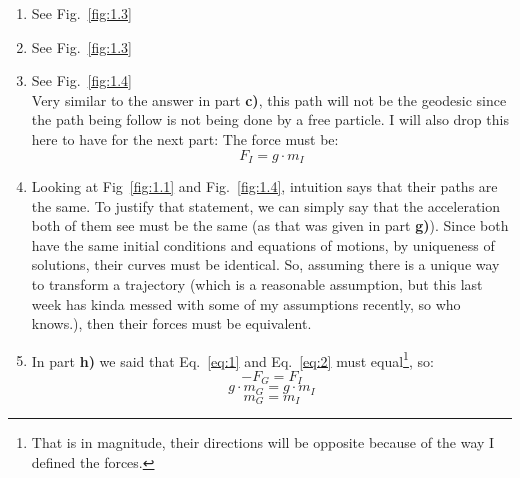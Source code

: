 \documentclass[12pt]{article}
\begin{document}
\begin{enumerate}[label=\alph*)]
\item See Fig.~\ref{fig:1.3}

\item See Fig.~\ref{fig:1.3}

\item See Fig.~\ref{fig:1.4}\\
Very similar to the answer in part {\bf c)}, this path will not be the geodesic since the path being follow is not being done by a free particle. I will also drop this here to have for the next part: The force must be:
\begin{equation}
F_I = g \cdot m_I
\label{eq:2}
\end{equation}


\item Looking at Fig~\ref{fig:1.1} and Fig.~\ref{fig:1.4}, intuition says that their paths are the same. To justify that statement, we can simply say that the acceleration both of them see must be the same (as that was given in part {\bf g)}). Since both have the same initial conditions and equations of motions, by uniqueness of solutions, their curves must be identical. So, assuming there is a unique way to transform a trajectory (which is a reasonable assumption, but this last week has kinda messed with some of my assumptions recently, so who knows.), then their forces must be equivalent. 

\item In part {\bf h)} we said that Eq.~\ref{eq:1} and Eq.~\ref{eq:2} must equal\footnote{That is in magnitude, their directions will be opposite because of the way I defined the forces.}, so:
\[-F_G = F_I\]
\[g \cdot m_G = g \cdot m_I\]
\[\boxed{m_G = m_I}\]

\end{enumerate}
\end{document}

